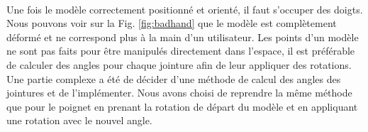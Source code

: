 \paragraph{} 
Une fois le modèle correctement positionné et orienté, il faut s'occuper des doigts.
Nous pouvons voir sur la Fig. \ref{fig:badhand} que le modèle est complètement déformé et ne correspond plus à la main d'un utilisateur. Les points d'un modèle ne sont pas faits pour être manipulés directement dans l'espace, il est préférable de calculer des angles pour chaque jointure afin de leur appliquer 
des rotations. Une partie complexe a été de décider d'une méthode de calcul des angles des jointures et de l'implémenter.
Nous avons choisi de reprendre la même méthode que pour le poignet en prenant la rotation de départ du modèle et en appliquant une rotation avec le nouvel angle.



